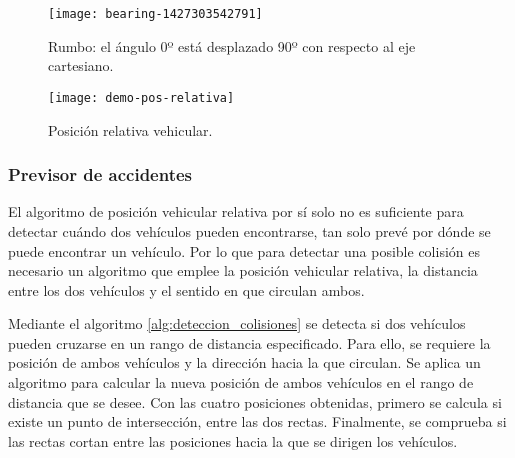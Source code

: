 \begin{figure}[h]
	\begin{center}
		\texttt{[image: bearing-1427303542791]}
		\caption{Rumbo: el ángulo 0º está desplazado 90º con respecto al eje cartesiano.}
		\label{figure:rumbo_gps}
	\end{center}
\end{figure}
\begin{figure}[h]
	\begin{center}
		\texttt{[image: demo-pos-relativa]}
		\caption{Posición relativa vehicular.}
		\label{figure:demo_pos_relativa}
	\end{center}
\end{figure}
\subsubsection{Previsor de accidentes}
El algoritmo de posición vehicular relativa por sí solo no es suficiente para detectar cuándo dos vehículos pueden encontrarse, tan solo prevé por dónde se puede encontrar un vehículo. Por lo que para detectar una posible colisión es necesario un algoritmo que emplee la posición vehicular relativa, la distancia entre los dos vehículos y el sentido en que circulan ambos.

Mediante el algoritmo \ref{alg:deteccion_colisiones} se detecta si dos vehículos pueden cruzarse en un rango de distancia especificado. Para ello, se requiere la posición de ambos vehículos y la dirección hacia la que circulan. Se aplica un algoritmo para calcular la nueva posición de ambos vehículos en el rango de distancia que se desee. Con las cuatro posiciones obtenidas, primero se calcula si existe un punto de intersección, entre las dos rectas. Finalmente, se comprueba si las rectas cortan entre las posiciones hacia la que se dirigen los vehículos.
\FloatBarrier